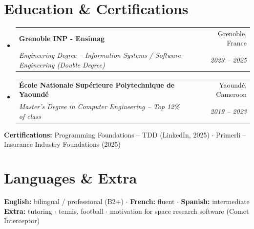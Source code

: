 \documentclass[letterpaper,10.5pt]{article}
\makeatletter
\newcommand{\resumeSubheading}[4]{
  \vspace{-1pt}\item
    \begin{tabular*}{0.97\textwidth}[t]{l@{\extracolsep{\fill}}r}
      \textbf{#1} & #2 \\
      \textit{\small#3} & \textit{\small #4} \\
    \end{tabular*}\vspace{-5pt}
}
\newcommand{\resumeSubHeadingListStart}{\begin{itemize}[leftmargin=0.15in, label={}]}
\newcommand{\resumeSubHeadingListEnd}{\end{itemize}}
\makeatother
\begin{document}
\section{Education \& Certifications}

\resumeSubHeadingListStart
  \resumeSubheading
    {Grenoble INP - Ensimag}{Grenoble, France}
    {Engineering Degree -- Information Systems / Software Engineering (Double Degree)}{2023 -- 2025}
  \resumeSubheading
    {\'Ecole Nationale Sup\'erieure Polytechnique de Yaound\'e}{Yaound\'e, Cameroon}
    {Master's Degree in Computer Engineering -- Top 12\% of class}{2019 -- 2023}
\resumeSubHeadingListEnd
\small{
\textbf{Certifications:} Programming Foundations -- TDD (LinkedIn, 2025) $\cdot$ Primerli -- Insurance Industry Foundations (2025)
}

\section{Languages \& Extra}
\small{
\textbf{English:} bilingual / professional (B2+) $\cdot$ \textbf{French:} fluent $\cdot$ \textbf{Spanish:} intermediate \\
\textbf{Extra:} tutoring $\cdot$ tennis, football $\cdot$ motivation for space research software (Comet Interceptor)
}
\end{document}
